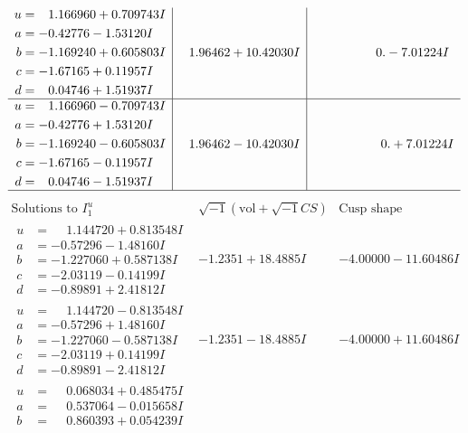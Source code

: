 \documentclass[1p]{elsarticle_modified}
\theoremstyle{definition}
\newcommand{\I}{\sqrt{-1}}
\begin{document}
$$\begin{array}{c|c|c}
\begin{aligned}
u &= \phantom{-}1.166960 + 0.709743 I \\
a &= -0.42776 - 1.53120 I \\
b &= -1.169240 + 0.605803 I \\
c &= -1.67165 + 0.11957 I \\
d &= \phantom{-}0.04746 + 1.51937 I\end{aligned}
 & \phantom{-}1.96462 + 10.42030 I & \phantom{-0.000000 } 0. - 7.01224 I \\ \hline\begin{aligned}
u &= \phantom{-}1.166960 - 0.709743 I \\
a &= -0.42776 + 1.53120 I \\
b &= -1.169240 - 0.605803 I \\
c &= -1.67165 - 0.11957 I \\
d &= \phantom{-}0.04746 - 1.51937 I\end{aligned}
 & \phantom{-}1.96462 - 10.42030 I & \phantom{-0.000000 -}0. + 7.01224 I\\
 \hline 
 \end{array}$$\newpage$$\begin{array}{c|c|c}  
\text{Solutions to }I^u_{1}& \I (\text{vol} + \sqrt{-1}CS) & \text{Cusp shape}\\
 \hline 
\begin{aligned}
u &= \phantom{-}1.144720 + 0.813548 I \\
a &= -0.57296 - 1.48160 I \\
b &= -1.227060 + 0.587138 I \\
c &= -2.03119 - 0.14199 I \\
d &= -0.89891 + 2.41812 I\end{aligned}
 & -1.2351 + 18.4885 I & -4.00000 - 11.60486 I \\ \hline\begin{aligned}
u &= \phantom{-}1.144720 - 0.813548 I \\
a &= -0.57296 + 1.48160 I \\
b &= -1.227060 - 0.587138 I \\
c &= -2.03119 + 0.14199 I \\
d &= -0.89891 - 2.41812 I\end{aligned}
 & -1.2351 - 18.4885 I & -4.00000 + 11.60486 I \\ \hline\begin{aligned}
u &= \phantom{-}0.068034 + 0.485475 I \\
a &= \phantom{-}0.537064 - 0.015658 I \\
b &= \phantom{-}0.860393 + 0.054239 I \\

\end{aligned}
\end{array}$$
\end{document}
